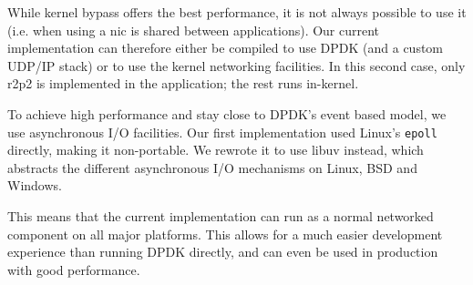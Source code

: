 While kernel bypass offers the best performance, it is not always possible to use it (i.e. when using a \gls{nic} is shared between applications).
Our current implementation can therefore either be compiled to use DPDK (and a custom UDP/IP stack) or to use the kernel networking facilities.
In this second case, only \gls{r2p2} is implemented in the application; the rest runs in-kernel.

To achieve high performance and stay close to DPDK's event based model, we use asynchronous I/O facilities.
Our first implementation used Linux's \texttt{epoll} directly, making it non-portable.
We rewrote it to use libuv instead, which abstracts the different asynchronous I/O mechanisms on Linux, BSD and Windows.

This means that the current implementation can run as a normal networked component on all major platforms.
This allows for a much easier development experience than running DPDK directly, and can even be used in production with good performance.
